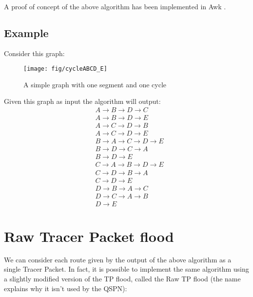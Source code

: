 \documentclass[a4paper]{article}
\begin{document}
A proof of concept of the above algorithm has been implemented in Awk
\cite{genrouteawk}.

\subsection*{Example}
Consider this graph:

\begin{figure}[h]
	\begin{center}
		\texttt{[image: fig/cycleABCD\_E]}
	\end{center}
	\caption{A simple graph with one segment and one cycle}
	\label{fig:gen_route_sample}
\end{figure}

Given this graph as input the algorithm will output:
\label{sec:genroute_output}
\begin{align*}
& A \rightarrow B \rightarrow D \rightarrow C\\
& A \rightarrow B \rightarrow D \rightarrow E\\
& A \rightarrow C \rightarrow D \rightarrow B\\
& A \rightarrow C \rightarrow D \rightarrow E\\
& B \rightarrow A \rightarrow C \rightarrow D \rightarrow E\\
& B \rightarrow D \rightarrow C \rightarrow A\\
& B \rightarrow D \rightarrow E\\
& C \rightarrow A \rightarrow B \rightarrow D \rightarrow E\\
& C \rightarrow D \rightarrow B \rightarrow A\\
& C \rightarrow D \rightarrow E\\
& D \rightarrow B \rightarrow A \rightarrow C\\
& D \rightarrow C \rightarrow A \rightarrow B\\
& D \rightarrow E
\end{align*}

\section{Raw Tracer Packet flood}
\label{sec:raw_TP_flood}

We can consider each route given by the output of the above algorithm as a
single Tracer Packet.
In fact, it is possible to implement the same algorithm using a slightly
modified version of the TP flood, called the Raw TP flood (the name explains
why it isn't used by the QSPN):
\end{document}
